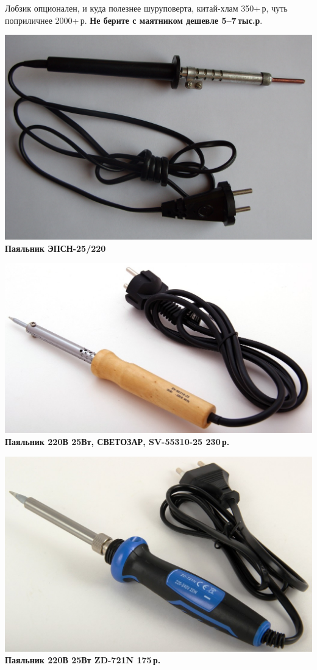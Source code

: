 \documentclass{magazine}
\begin{document}
\begin{multicols}{2}
Лобзик опционален, и куда полезнее шуруповерта, китай-хлам 
350+\,р, чуть поприличнее 2000+\,р. 
\textbf{Не берите с маятником дешевле 5--7\,тыс.р}.

\noindent\includegraphics[width=\columnwidth]{fig/00/EPSN25.jpg}
\textbf{Паяльник ЭПСН-25/220}

\noindent\href{http://voltmaster-samara.ru/catalog/product/00067650/}{
\includegraphics[width=\columnwidth]{fig/00/SV-55310-25.jpg}}
\textbf{Паяльник 220В 25Вт, СВЕТОЗАР, SV-55310-25 230\,р.}

\noindent\href{http://voltmaster-samara.ru/catalog/product/00091478/}{
\includegraphics[width=\columnwidth]{fig/00/ZD-721N.jpg}}
\textbf{Паяльник 220В 25Вт ZD-721N 175\,р.}


\end{multicols}
\end{document}
